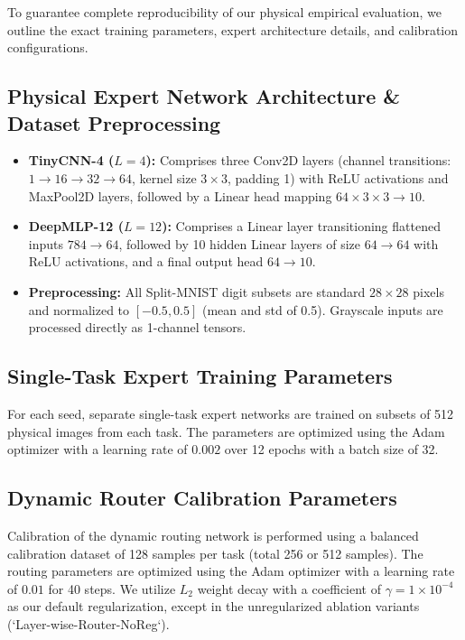 To guarantee complete reproducibility of our physical empirical evaluation, we outline the exact training parameters, expert architecture details, and calibration configurations.

\subsection{Physical Expert Network Architecture \& Dataset Preprocessing}
\begin{itemize}
    \item \textbf{TinyCNN-4 ($L=4$):} Comprises three Conv2D layers (channel transitions: $1 \to 16 \to 32 \to 64$, kernel size $3\times3$, padding 1) with ReLU activations and MaxPool2D layers, followed by a Linear head mapping $64 \times 3 \times 3 \to 10$.
    \item \textbf{DeepMLP-12 ($L=12$):} Comprises a Linear layer transitioning flattened inputs $784 \to 64$, followed by 10 hidden Linear layers of size $64 \to 64$ with ReLU activations, and a final output head $64 \to 10$.
    \item \textbf{Preprocessing:} All Split-MNIST digit subsets are standard $28 \times 28$ pixels and normalized to $[-0.5, 0.5]$ (mean and std of 0.5). Grayscale inputs are processed directly as 1-channel tensors.
\end{itemize}

\subsection{Single-Task Expert Training Parameters}
For each seed, separate single-task expert networks are trained on subsets of 512 physical images from each task. The parameters are optimized using the Adam optimizer with a learning rate of $0.002$ over 12 epochs with a batch size of 32.

\subsection{Dynamic Router Calibration Parameters}
Calibration of the dynamic routing network is performed using a balanced calibration dataset of 128 samples per task (total 256 or 512 samples). The routing parameters are optimized using the Adam optimizer with a learning rate of $0.01$ for 40 steps. We utilize $L_2$ weight decay with a coefficient of $\gamma = 1\times 10^{-4}$ as our default regularization, except in the unregularized ablation variants (`Layer-wise-Router-NoReg`).

